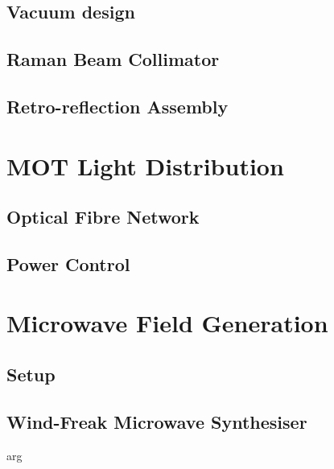 \subsection{Vacuum design}\label{subsec:setup_ramandesign}
\subsection{Raman Beam Collimator}\label{subsec:setup_ramancollimator}
\subsection{Retro-reflection Assembly}\label{subsec:setup_ramanmirror}
\section{MOT Light Distribution}\label{sec:setup_lightdist}
\subsection{Optical Fibre Network}\label{subsec:setup_fibrenet}
\subsection{Power Control}\label{subsec:setup_lightpower}

\section{Microwave Field Generation}\label{sec:setup_microwave}
\subsection{Setup}\label{subsec:setup_microwave_setup}
\subsection{Wind-Freak Microwave Synthesiser}\label{subsec:setup_windfreak}arg